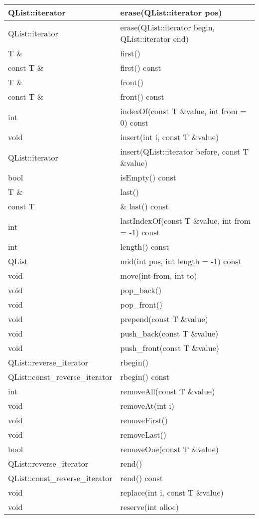 \begin{longtable}[l]{|l|m{25em}|}
\hline
QList::iterator &	erase(QList::iterator pos)\\
\hline
QList::iterator &	erase(QList::iterator begin, QList::iterator
                  end)\\
\hline
T \& &	first()\\
\hline
const T \& &	first() const\\
\hline
T \& &	front()\\
\hline
const T \& & 	front() const\\
\hline
int &	indexOf(const T \&value, int from = 0) const\\
\hline
void &	insert(int i, const T \&value)\\
\hline
QList::iterator& 	insert(QList::iterator before, const T \&value)\\
\hline
bool 	&isEmpty() const\\
\hline
T \& &	last()\\
\hline
const T& \& 	last() const\\
\hline
int &	lastIndexOf(const T \&value, int from = -1) const\\
\hline
int 	&length() const\\
\hline
QList& 	mid(int pos, int length = -1) const\\
\hline
void& 	move(int from, int to)\\
\hline
void& 	pop\_back()\\
\hline
void& 	pop\_front()\\
\hline
void& 	prepend(const T \&value)\\
\hline
void& 	push\_back(const T \&value)\\
\hline
void& 	push\_front(const T \&value)\\
\hline
QList::reverse\_iterator &	rbegin()\\
\hline
QList::const\_reverse\_iterator &	rbegin() const\\
\hline
int& 	removeAll(const T \&value)\\
\hline
void& 	removeAt(int i)\\
\hline
void& 	removeFirst()\\
\hline
void& 	removeLast()\\
\hline
bool& 	removeOne(const T \&value)\\
\hline
QList::reverse\_iterator &	rend()\\
\hline
QList::const\_reverse\_iterator &	rend() const\\
\hline
void& 	replace(int i, const T \&value)\\
\hline
void& 	reserve(int alloc)\\

\end{longtable}
